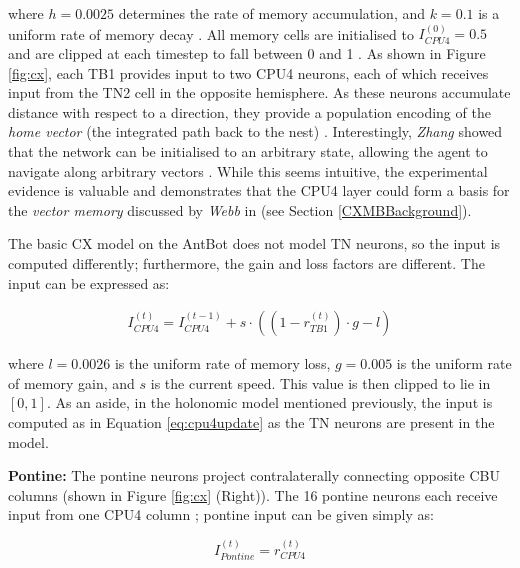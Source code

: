 \documentclass[a4paper,11pt,twoside,openright]{article}
\begin{document}
where $h = 0.0025$ determines the rate of memory accumulation, and $k = 0.1$ is
a uniform rate of memory decay \cite{Stone2017}. All memory cells are initialised
to $I_{CPU4}^{(0)} = 0.5$ and are clipped at each timestep to fall between 0 and
1 \cite{Stone2017}. As shown in Figure \ref{fig:cx}, each TB1 provides input to
two CPU4 neurons, each of which receives input from the TN2 cell in the opposite
hemisphere. As these neurons accumulate distance with respect to a direction,
they provide a population encoding of the \textit{home vector} (the integrated
path back to the nest) \cite{Stone2017}. Interestingly, \textit{Zhang} showed
that the network can be initialised to an arbitrary state, allowing the agent
to navigate along arbitrary vectors \cite{Zhang2017}. While this seems intuitive,
the experimental evidence is valuable and demonstrates that the CPU4 layer could
form a basis for the \textit{vector memory} discussed by \textit{Webb} in
\cite{Webb2019} (see Section \ref{CXMBBackground}).
\newline
\par

The basic CX model on the AntBot does not model TN neurons, so the input is
computed differently; furthermore, the gain and loss factors are different.
The input can be expressed as:

\begin{align}
  I_{CPU4}^{(t)} =
  I_{CPU4}^{(t - 1)} + s \cdot ((1 - r_{TB1}^{(t)}) \cdot g - l)
\end{align}

where $l = 0.0026$ is the uniform rate of memory loss, $g = 0.005$ is the
uniform rate of memory gain, and $s$ is the current speed. This value is
then clipped to lie in $[0,1]$. As an aside, in the holonomic model
mentioned previously, the input is computed as in Equation \ref{eq:cpu4update}
as the TN neurons are present in the model.
\newline\par

\textbf{Pontine:}
The pontine neurons project contralaterally connecting opposite CBU columns
(shown in Figure \ref{fig:cx} (Right)). The 16 pontine neurons each receive input
from one CPU4 column \cite{Stone2017}; pontine input can be given simply as:
\newline
\par

\begin{equation}
  I_{Pontine}^{(t)} = r_{CPU4}^{(t)}
\end{equation}
\end{document}
